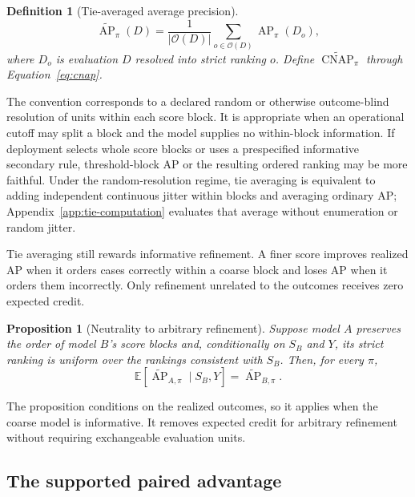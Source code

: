 \documentclass[11pt]{article}
\newcommand{\AP}{\operatorname{AP}}
\newcommand{\CNAP}{\operatorname{CNAP}}
\newcommand{\E}{\mathbb{E}}
\newcommand{\APta}{\widetilde{\AP}}
\newcommand{\CNAPta}{\widetilde{\CNAP}}
\newtheorem{definition}{Definition}
\newtheorem{proposition}{Proposition}
\theoremstyle{remark}
\begin{document}
\begin{definition}[Tie-averaged average precision]
\begin{equation}
\APta_\pi(D)
=
\frac{1}{|\mathcal O(D)|}
\sum_{o\in\mathcal O(D)}
\AP_\pi(D_o),
\label{eq:tie-average}
\end{equation}
where $D_o$ is evaluation $D$ resolved into strict ranking $o$. Define $\CNAPta_\pi$ through Equation~\eqref{eq:cnap}.
\end{definition}

The convention corresponds to a declared random or otherwise outcome-blind resolution of units within each score block. It is appropriate when an operational cutoff may split a block and the model supplies no within-block information. If deployment selects whole score blocks or uses a prespecified informative secondary rule, threshold-block AP or the resulting ordered ranking may be more faithful. Under the random-resolution regime, tie averaging is equivalent to adding independent continuous jitter within blocks and averaging ordinary AP; Appendix~\ref{app:tie-computation} evaluates that average without enumeration or random jitter.

Tie averaging still rewards informative refinement. A finer score improves realized AP when it orders cases correctly within a coarse block and loses AP when it orders them incorrectly. Only refinement unrelated to the outcomes receives zero expected credit.

\begin{proposition}[Neutrality to arbitrary refinement]
\label{prop:refinement}
Suppose model $A$ preserves the order of model $B$'s score blocks and, conditionally on $S_B$ and $Y$, its strict ranking is uniform over the rankings consistent with $S_B$. Then, for every $\pi$,
\[
\E\!\left[
\APta_{A,\pi}\mid S_B,Y
\right]
=
\APta_{B,\pi}.
\]
\end{proposition}

The proposition conditions on the realized outcomes, so it applies when the coarse model is informative. It removes expected credit for arbitrary refinement without requiring exchangeable evaluation units.

\subsection{The supported paired advantage}
\end{document}
